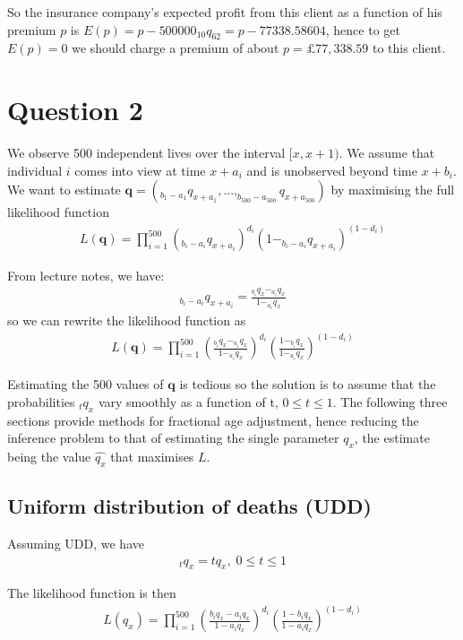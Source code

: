 \documentclass[a4paper,11pt]{article}
\theoremstyle{mytheor}
\begin{document}
So the insurance company's expected profit from this client as a function of his premium $p$ is $E(p) = p - 500000_{10}q_{62} = p - 77338.58604$, hence to get $E(p) = 0$ we should charge a premium of about $p = £77,338.59$ to this client.

\newpage

\section*{Question 2}

We observe 500 independent lives over the interval $[x,x+1)$. We assume that individual $i$ comes into view at time $x+a_i$ and is unobserved beyond time $x+b_i$. We want to estimate $\textbf{q} = (_{b_1-a_1}q_{x+a_1}, ... ,_{b_{500}-a_{500}}q_{x+a_{500}})$ by maximising the full likelihood function 
\begin{align*}
    L(\textbf{q}) = \prod_{i = 1}^{500}(_{b_i-a_i}q_{x+a_i})^{d_i}(1-_{b_i-a_i}q_{x+a_i})^{(1-d_i)}
\end{align*}

From lecture notes, we have:
\begin{align*}
   _{b_i-a_i}q_{x+a_i} = \frac{_{b_i}q_x - _{a_i}q_x}{1 - _{a_i}q_x}
\end{align*}
so we can rewrite the likelihood function as
\begin{align*}
    L(\textbf{q}) = \prod_{i = 1}^{500}\left(\frac{_{b_i}q_x - _{a_i}q_x}{1 - _{a_i}q_x}\right)^{d_i}\left(\frac{1 - _{b_i}q_x}{1 - _{a_i}q_x}\right)^{(1-d_i)}
\end{align*}

Estimating the 500 values of $\textbf{q}$ is tedious so the solution is to assume that the probabilities $_tq_x$ vary smoothly as a function of t, $0\leq t \leq 1$. The following three sections provide methods for fractional age adjustment, hence reducing the inference problem to that of estimating the single parameter $q_x$, the estimate being the value $\hat{q_x}$ that maximises $L$.

\subsection*{Uniform distribution of deaths (UDD)}

Assuming UDD, we have 
\begin{align*}
    _tq_x = tq_x, \; 0 \leq t \leq 1
\end{align*}

The likelihood function is then
\begin{align*}
    L(q_x) = \prod_{i = 1}^{500}\left(\frac{b_iq_x - a_iq_x}{1 - a_iq_x}\right)^{d_i}\left(\frac{1 - b_iq_x}{1 - a_iq_x}\right)^{(1-d_i)}
\end{align*}
\end{document}
